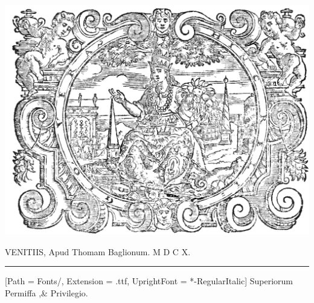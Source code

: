 \documentclass{article}
\begin{document}
\begin{center}
\includegraphics[scale=0.9]{Images/SidereusNunciusTitlePageImageBW.png}


V\hspace{1mm}E\hspace{1mm}N\hspace{1mm}I\hspace{1mm}T\hspace{1mm}I\hspace{1mm}I\hspace{1mm}S\hspace{1mm}, Apud Thomam Baglionum. M\hspace{1mm} D C\hspace{1mm} X.
\noindent\rule{310pt}{1pt}

\setmainfont{EBGaramond}[Path = Fonts/, 
                         Extension = .ttf,
                         UprightFont = *-RegularItalic]
\fontsize{13}{13}\selectfont
Superiorum Permiffa ,\& Privilegio.


\end{center}
\end{document}

